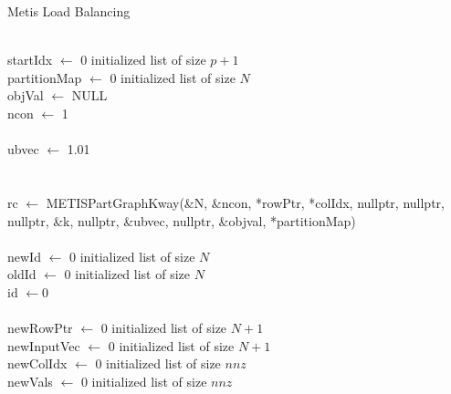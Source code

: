 \documentclass{article}
\begin{document}
    \begin{algorithm}[H]
        \caption{Metis Load Balancing}
        \SetAlgoVlined

        \phantom{a}\\
        startIdx \( \leftarrow \) 0 initialized list of size \( p + 1 \)\\
        partitionMap \( \leftarrow \) 0 initialized list of size \( N \)\\
        objVal \( \leftarrow \) NULL\\
        ncon \( \leftarrow \) 1\\
        \phantom{a}\\
        ubvec \( \leftarrow \) 1.01\\

        \phantom{a}\\

        \phantom{a}\\

        rc \( \leftarrow \) METISPartGraphKway(\&N, \&ncon, *rowPtr, *colIdx, nullptr, nullptr, nullptr, \&k, nullptr, \&ubvec, nullptr, \&objval, *partitionMap)\\
        \phantom{a}\\
        newId \( \leftarrow \) 0 initialized list of size \( N \)\\
        oldId \( \leftarrow \) 0 initialized list of size \( N \)\\
        id \( \leftarrow \)0\\

        \phantom{a}\\
        newRowPtr \( \leftarrow \) 0 initialized list of size \( N+1 \)\\
        newInputVec \( \leftarrow \) 0 initialized list of size \( N+1 \)\\
        newColIdx \( \leftarrow \) 0 initialized list of size \( nnz \)\\
        newVals \( \leftarrow \) 0 initialized list of size \( nnz \)\\
        \phantom{a}\\


\end{algorithm}
\end{document}
